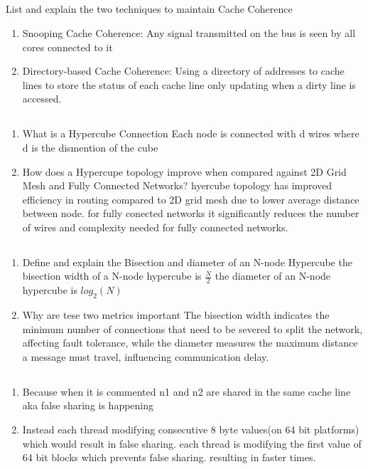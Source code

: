 \documentclass[12pt]{article}
\begin{document}
\subsection{}
List and explain the two techniques to maintain Cache Coherence 
\begin{enumerate}
	\item Snooping Cache Coherence: 
	\subitem Any signal transmitted on the bus is seen by all cores connected
	to it
	\item Directory-based Cache Coherence: 
	\subitem Using a directory of addresses to cache lines to store the status of each cache line only updating when a dirty line is accessed.
\end{enumerate}

\subsection{}
\begin{enumerate}
	\item What is a Hypercube Connection
	\subitem Each node is connected with d wires where d is the dismention of the cube
	\item How does a Hypercupe topology improve when compared against 2D Grid Mesh and Fully Connected Networks?
	\subitem hyercube topology has improved efficiency in routing compared to 2D grid mesh due to lower average distance between node.
	\subitem for fully conected networks it significantly reduces the number of wires and complexity needed for fully connected networks.
\end{enumerate}

\subsection{}
\begin{enumerate}
	\item Define and explain the Bisection and diameter of an N-node Hypercube
	\subitem the bisection width of a N-node hypercube is $\frac N2$
	\subitem the diameter of an N-node hypercube is $log_2(N)$
	\item Why are tese two metrics important
	\subitem The bisection width indicates the minimum number of connections that need to be severed to split the network, affecting fault tolerance, while the diameter measures the maximum distance a message must travel, influencing communication delay.
\end{enumerate}

\subsection{}
\begin{enumerate}
	\item Because when it is commented n1 and n2 are shared in the same cache line aka false sharing is happening
	\item Instead each thread modifying consecutive 8 byte values(on 64 bit platforms) which would result in false sharing. each thread is modifying the first value of 64 bit blocks which prevents false sharing. resulting in faster times.
\end{enumerate}
\end{document}
